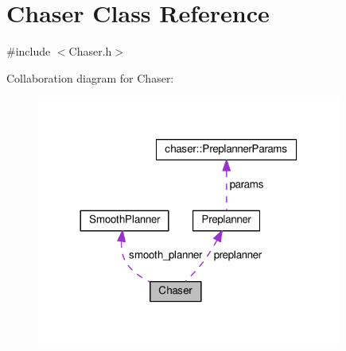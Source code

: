 \hypertarget{class_chaser}{}\section{Chaser Class Reference}
\label{class_chaser}


{\ttfamily \#include $<$Chaser.\+h$>$}



Collaboration diagram for Chaser\+:\nopagebreak
\begin{figure}[H]
\begin{center}
\leavevmode
\includegraphics[width=284pt]{class_chaser__coll__graph}
\end{center}
\end{figure}
